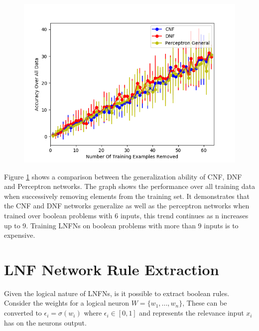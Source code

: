 
\begin{figure}[H]
	\centering
	\begin{minipage}[b]{0.8\textwidth}
		\includegraphics[width=\textwidth]{6-generalization.png}
		\caption{}
		\label{fig:generalization-peformance-6}
	\end{minipage}
	\hfill
\end{figure}

Figure \ref{fig:generalization-peformance-6} shows a comparison between the generalization ability of CNF, DNF and Perceptron networks. The graph shows the performance over all training data when successively removing elements from the training set. It demonstrates that the CNF and DNF networks generalize as well as the perceptron networks when trained over boolean problems with 6 inputs, this trend continues as n increases up to 9. Training LNFNs on boolean problems with more than 9 inputs is to expensive.

\section{LNF Network Rule Extraction} \label{sec:lnfn-rule-extraction}
Given the logical nature of LNFNs, is it possible to extract boolean rules. Consider the weights for a logical neuron $W = \{w_1, ..., w_n\}$, These can be converted to $\epsilon_i = \sigma(w_i)$ where $\epsilon_i \in [0, 1]$ and represents the relevance input $x_i$ has on the neurons output.\\

